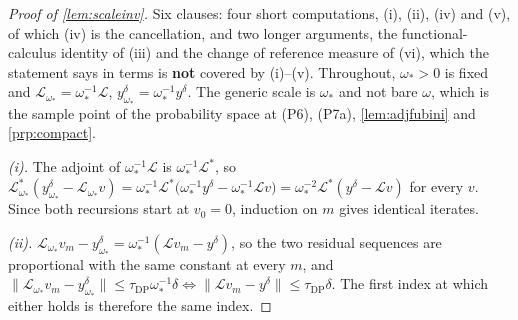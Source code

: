 \begin{proof}[Proof of \cref{lem:scaleinv}]
Six clauses: four short computations, \textup{(i)}, \textup{(ii)}, \textup{(iv)} and
\textup{(v)}, of which \textup{(iv)} is the cancellation, and two longer arguments, the
functional-calculus identity of \textup{(iii)} and the change of reference measure of \textup{(vi)},
which the statement says in terms is \textbf{not} covered by \textup{(i)}--\textup{(v)}. Throughout,
$\omega_\ast>0$ is fixed and $\mathcal L_{\omega_\ast}=\omega_\ast^{-1}\mathcal L$,
$y^\delta_{\omega_\ast}=\omega_\ast^{-1}y^\delta$. The generic scale is $\omega_\ast$ and not bare
$\omega$, which is the sample point of the probability space at (P6), (P7a), \cref{lem:adjfubini} and
\cref{prp:compact}.

\emph{(i).} The adjoint of $\omega_\ast^{-1}\mathcal L$ is $\omega_\ast^{-1}\mathcal L^{\ast}$, so
$\mathcal L^{\ast}_{\omega_\ast}(y^\delta_{\omega_\ast}-\mathcal L_{\omega_\ast} v)
=\omega_\ast^{-1}\mathcal L^{\ast}\big(\omega_\ast^{-1}y^\delta-\omega_\ast^{-1}\mathcal Lv\big)
=\omega_\ast^{-2}\mathcal L^{\ast}(y^\delta-\mathcal Lv)$ for every $v$. Since both recursions start at
$v_0=0$, induction on $m$ gives identical iterates.

\emph{(ii).} $\mathcal L_{\omega_\ast} v_m-y^\delta_{\omega_\ast}=\omega_\ast^{-1}(\mathcal Lv_m-y^\delta)$,
so the two residual sequences are proportional with the same constant at every $m$, and
$\|\mathcal L_{\omega_\ast} v_m-y^\delta_{\omega_\ast}\|\le\tau_{\mathrm{DP}}\omega_\ast^{-1}\delta
\iff\|\mathcal Lv_m-y^\delta\|\le\tau_{\mathrm{DP}}\delta$. The first index at which either holds is
therefore the same index.


\end{proof}
